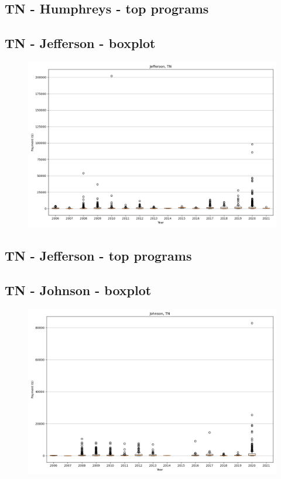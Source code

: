 \subsection*{TN - Humphreys - top programs}

\newpage
\subsection*{TN - Jefferson - boxplot}
\begin{figure}[h]
\centering
\includegraphics[width=7in]{../output/boxplots/counties/Jefferson-TN_boxplot.png}
\end{figure}


\subsection*{TN - Jefferson - top programs}

\newpage
\subsection*{TN - Johnson - boxplot}
\begin{figure}[h]
\centering
\includegraphics[width=7in]{../output/boxplots/counties/Johnson-TN_boxplot.png}
\end{figure}


